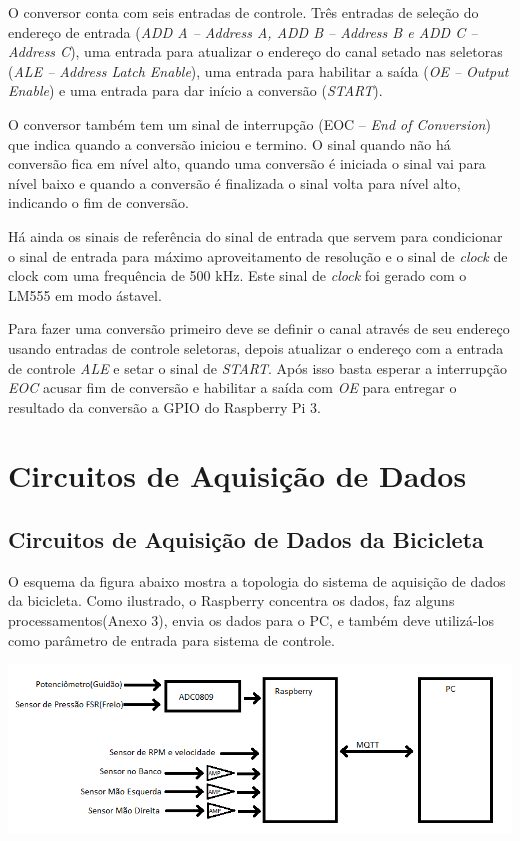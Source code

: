 	O conversor conta com seis entradas de controle. Três entradas de seleção do endereço de entrada (\textit{ADD A – Address A, ADD B – Address B e ADD C – Address C}), uma entrada para atualizar o endereço do canal setado nas seletoras (\textit{ALE – Address Latch Enable}), uma entrada para habilitar a saída (\textit{OE – Output Enable}) e uma entrada para dar início a conversão (\textit{START}).

	O conversor também tem um sinal de interrupção (EOC – \textit{End of Conversion}) que indica quando a conversão iniciou e termino. O sinal quando não há conversão fica em nível alto, quando uma conversão é iniciada o sinal vai para nível baixo e quando a conversão é finalizada o sinal volta para nível alto, indicando o fim de conversão.

	Há ainda os sinais de referência do sinal de entrada que servem para condicionar o sinal de entrada para máximo aproveitamento de resolução e o sinal de \textit{clock} de clock com uma frequência de 500 kHz. Este sinal de \textit{clock} foi gerado com o LM555 em modo ástavel. 

	Para fazer uma conversão primeiro deve se definir o canal através de seu endereço usando entradas de controle seletoras, depois atualizar o endereço com a entrada de controle \textit{ALE} e setar o sinal de \textit{START}. Após isso basta esperar a interrupção \textit{EOC} acusar fim de conversão e habilitar a saída com \textit{OE} para entregar o resultado da conversão a GPIO do Raspberry Pi 3.



\section{Circuitos de Aquisição de Dados}


\subsection{Circuitos de Aquisição de Dados da Bicicleta}

O esquema da figura abaixo mostra a topologia do sistema de aquisição de dados da bicicleta.  Como ilustrado, o Raspberry  concentra os dados, faz alguns processamentos(Anexo 3), envia os dados para o PC,  e também deve utilizá-los como parâmetro de entrada para sistema de controle.  
            \begin{center}
   	\includegraphics[scale=0.80]{figuras/sensores.png}
        \label{sensores}
   \end{center}


